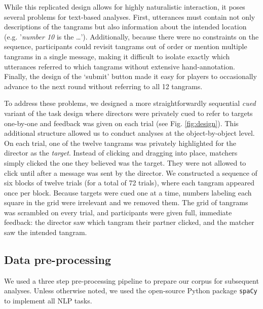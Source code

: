 \documentclass[alpha-refs]{wiley-article}
\begin{document}
While this replicated design allows for highly naturalistic interaction, it poses several problems for text-based analyses. 
First, utterances must contain not only descriptions of the tangrams but also information about the intended location (e.g. '\emph{number 10} is the \dots'). 
Additionally, because there were no constraints on the sequence, participants could revisit tangrams out of order or mention multiple tangrams in a single message, making it difficult to isolate exactly which utterances referred to which tangrams without extensive hand-annotation. 
Finally, the design of the `submit' button made it easy for players to occasionally advance to the next round without referring to all 12 tangrams. 

To address these problems, we designed a more straightforwardly sequential \emph{cued} variant of the task design where directors were privately cued to refer to targets one-by-one and feedback was given on each trial (see Fig. \ref{fig:design}).
This additional structure allowed us to conduct analyses at the object-by-object level. 
On each trial, one of the twelve tangrams was privately highlighted for the director as the \emph{target}. 
Instead of clicking and dragging into place, matchers simply clicked the one they believed was the target. 
They were not allowed to click until after a message was sent by the director.  
We constructed a sequence of six blocks of twelve trials (for a total of 72 trials), where each tangram appeared once per block.
Because targets were cued one at a time, numbers labeling each square in the grid were irrelevant and we removed them. 
The grid of tangrams was scrambled on every trial, and participants were given full, immediate feedback: the director saw which tangram their partner clicked, and the matcher saw the intended tangram.

\subsection{Data pre-processing}

We used a three step pre-processing pipeline to prepare our corpus for subsequent analyses. Unless otherwise noted, we used the open-source Python package \texttt{spaCy} to implement all NLP tasks. 
\end{document}
